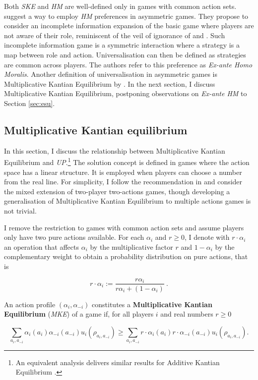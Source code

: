 Both \textit{SKE} and \textit{HM} are well-defined only in games with common action sets. \cite{algerHomoMoralisPreference2013} suggest a way to employ \textit{HM} preferences in asymmetric games. They propose to consider an incomplete information expansion of the basic game where players are not aware of their role, reminiscent of the veil of ignorance of \cite{harsanyiCardinalWelfareIndividualistic1955} and \cite{rawls1971theory}. Such incomplete information game is a symmetric interaction where a strategy is a map between role and action. Universalisation can then be defined as strategies are common across players. The authors refer to this preference as \textit{Ex-ante Homo Moralis}. Another definition of universalisation in asymmetric games is Multiplicative Kantian Equilibrium by \cite{roemer2019cooperate}. In the next section, I discuss Multiplicative Kantian Equilibrium, postponing observations on \textit{Ex-ante HM} to Section \ref{sec:esu}.

\subsection{Multiplicative Kantian equilibrium}\label{sec:mult}

In this section, I discuss the relationship between Multiplicative Kantian Equilibrium and \textit{UP}.\footnote{An equivalent analysis delivers similar results for Additive Kantian Equilibrium \citep{roemer2019cooperate}.} The solution concept is defined in games where the action space has a linear structure. It is employed when players can choose a number from the real line. For simplicity, I follow the recommendation in \citet[p. 42]{roemer2019cooperate} and consider the mixed extension of two-player two-actions games, though developing a generalisation of Multiplicative Kantian Equilibrium to multiple actions games is not trivial.

I remove the restriction to games with common action sets and assume players only have two pure actions available. For each \( \alpha_i \) and \( r \geq 0 \), I denote with \( r \cdot \alpha_i \) an operation that affects \( \alpha_i \) by the multiplicative factor \( r \) and \( 1 - \alpha_i \) by the complementary weight to obtain a probability distribution on pure actions, that is

\[ r \cdot \alpha_i :=\frac{r \alpha_i }{r \alpha_i +(1-\alpha_i)} \: .\]

\begin{definition}
	An action profile \( (\alpha_i, \alpha_{-i} ) \) constitutes a \textbf{Multiplicative Kantian Equilibrium} (\textit{MKE}) of a game if, for all players \( i \) and real numbers \( r \geq 0 \)

	\[
		\sum_{a_i, a_{-i}} \alpha_{i} (a_i) \alpha_{-i} (a_{-i}) u_i(\rho_{a_i, a_{-i}}) \geq \sum_{a_i, a_{-i}} r \cdot \alpha_{i} (a_i) r \cdot \alpha_{-i} (a_{-i}) u_i(\rho_{a_i, a_{-i}}).
	\]
\end{definition}

